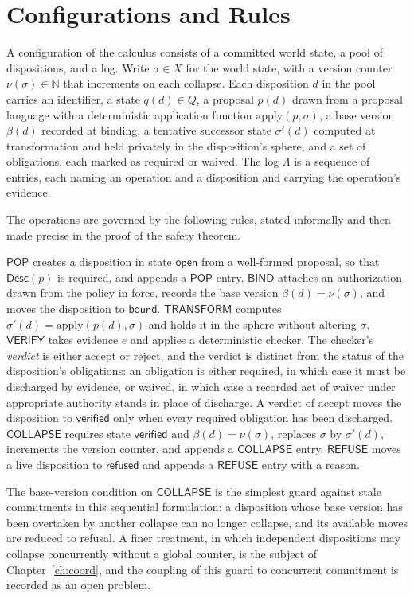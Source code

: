 \documentclass[11pt,twoside,openright]{book}
\theoremstyle{plain}
\theoremstyle{definition}
\theoremstyle{remark}
\newcommand{\N}{\mathbb{N}}
\newcommand{\Desc}{\mathsf{Desc}}
\newcommand{\pop}{\mathsf{POP}}
\newcommand{\refuse}{\mathsf{REFUSE}}
\newcommand{\bind}{\mathsf{BIND}}
\newcommand{\transform}{\mathsf{TRANSFORM}}
\newcommand{\verify}{\mathsf{VERIFY}}
\newcommand{\collapse}{\mathsf{COLLAPSE}}
\begin{document}
\section{Configurations and Rules}

A configuration of the calculus consists of a committed world state, a pool of dispositions, and a log. Write $\sigma\in X$ for the world state, with a version counter $\nu(\sigma)\in\N$ that increments on each collapse. Each disposition $d$ in the pool carries an identifier, a state $q(d)\in Q$, a proposal $p(d)$ drawn from a proposal language with a deterministic application function $\mathrm{apply}(p,\sigma)$, a base version $\beta(d)$ recorded at binding, a tentative successor state $\sigma'(d)$ computed at transformation and held privately in the disposition's sphere, and a set of obligations, each marked as required or waived. The log $\Lambda$ is a sequence of entries, each naming an operation and a disposition and carrying the operation's evidence.

The operations are governed by the following rules, stated informally and then made precise in the proof of the safety theorem.

$\pop$ creates a disposition in state $\mathsf{open}$ from a well-formed proposal, so that $\Desc(p)$ is required, and appends a $\pop$ entry. $\bind$ attaches an authorization drawn from the policy in force, records the base version $\beta(d)=\nu(\sigma)$, and moves the disposition to $\mathsf{bound}$. $\transform$ computes $\sigma'(d)=\mathrm{apply}(p(d),\sigma)$ and holds it in the sphere without altering $\sigma$. $\verify$ takes evidence $e$ and applies a deterministic checker. The checker's \emph{verdict} is either accept or reject, and the verdict is distinct from the status of the disposition's obligations: an obligation is either required, in which case it must be discharged by evidence, or waived, in which case a recorded act of waiver under appropriate authority stands in place of discharge. A verdict of accept moves the disposition to $\mathsf{verified}$ only when every required obligation has been discharged. $\collapse$ requires state $\mathsf{verified}$ and $\beta(d)=\nu(\sigma)$, replaces $\sigma$ by $\sigma'(d)$, increments the version counter, and appends a $\collapse$ entry. $\refuse$ moves a live disposition to $\mathsf{refused}$ and appends a $\refuse$ entry with a reason.

The base-version condition on $\collapse$ is the simplest guard against stale commitments in this sequential formulation: a disposition whose base version has been overtaken by another collapse can no longer collapse, and its available moves are reduced to refusal. A finer treatment, in which independent dispositions may collapse concurrently without a global counter, is the subject of Chapter~\ref{ch:coord}, and the coupling of this guard to concurrent commitment is recorded as an open problem.
\end{document}
